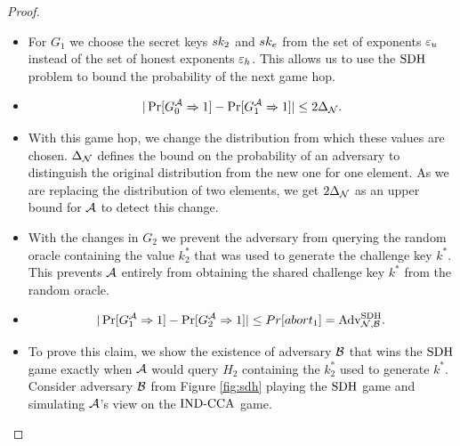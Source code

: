 \begin{proof}
                                \begin{itemize}
                                \item[\textbf{Game 1}]
                                    For $G_1$ we choose the secret keys $sk_2$ and $sk_e$ from the set of exponents $\varepsilon_u$ instead of the set of honest exponents $\varepsilon_h$.
                                    This allows us to use the $\text{SDH}$ problem to bound the probability of the next game hop.

                                \item[\emph{Claim 1}]

                                    \[ | \Pr[G^{\mathcal{A}}_{0} \Rightarrow 1] - \Pr[G^{\mathcal{A}}_{1} \Rightarrow 1] | \leq 2 \Delta_{\mathcal{N}}. \]

                                \item[\emph{Proof}]
                                    With this game hop, we change the distribution from which these values are chosen.
                                    $\Delta_{\mathcal{N}}$ defines the bound on the probability of an adversary to distinguish the original distribution from the new one for one element.
                                    As we are replacing the distribution of two elements, we get $2 \Delta_{\mathcal{N}}$ as an upper bound for $\mathcal{A}$ to detect this change.
                                \end{itemize}

                                \begin{itemize}
                                \item[\textbf{Game 2}]
                                    With the changes in $G_2$ we prevent the adversary from querying the random oracle containing the value $k^*_2$ that was used to generate the challenge key $k^*$.
                                    This prevents $\mathcal{A}$ entirely from obtaining the shared challenge key $k^*$ from the random oracle.

                                \item[\emph{Claim 2}]

                                    \[ | \Pr[G^{\mathcal{A}}_{1} \Rightarrow 1] - \Pr[G^{\mathcal{A}}_{2} \Rightarrow 1] | \leq Pr[abort_1] = \text{Adv}_{\mathcal{N}, \mathcal{B}}^{\text{SDH}}. \]

                                \item[\emph{Proof}]
                                    To prove this claim, we show the existence of adversary $\mathcal{B}$ that wins the $\text{SDH}$ game exactly when $\mathcal{A}$ would query $H_2$ containing the $k^*_2$ used to generate $k^*$.
                                    Consider adversary $\mathcal{B}$ from Figure \ref{fig:sdh} playing the $\text{SDH}$ game and simulating $\mathcal{A}$'s view on the $\text{IND-CCA}$ game.


\end{itemize}
\end{proof}
